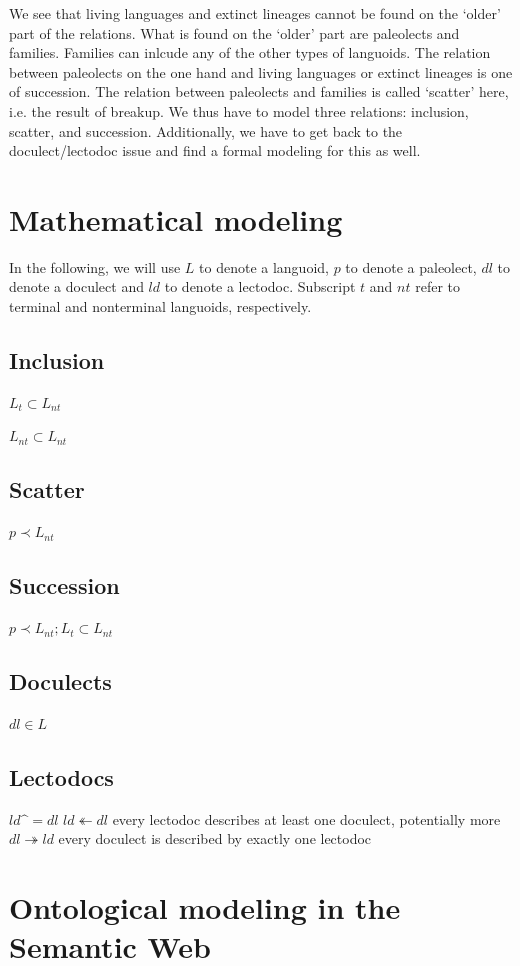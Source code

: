 \documentclass[a4paper,10pt]{article}
\begin{document}
We see that living languages and extinct lineages cannot be found on the `older' part of the relations. What is found on the `older' part are paleolects and families. Families can inlcude any of the other types of languoids. The relation between paleolects on the one hand and living languages or extinct lineages is one of succession. The relation between paleolects and families is called `scatter' here, i.e. the result of breakup. We thus have to model three relations: inclusion, scatter, and succession. Additionally, we have to get back to the doculect/lectodoc issue and find a formal modeling for this as well.

\section{Mathematical modeling}
In the following, we will use $L$ to denote a languoid, $p$ to denote a paleolect, $dl$ to denote a doculect and $ld$ to denote a lectodoc. Subscript $t$ and $nt$ refer to terminal and nonterminal languoids, respectively.

\subsection{Inclusion}
$L_{t} \subset L_{nt}$

$L_{nt} \subset L_{nt}$

\subsection{Scatter}
$p \prec L_{nt}$\prec

\subsection{Succession}
$p \prec L_{nt}; L_{t} \subset L_{nt} $

\subsection{Doculects}
$dl \in L $

\subsection{Lectodocs}
$ld \^= dl $
$ld \twoheadleftarrow  dl$ every lectodoc describes at least one doculect, potentially more
$dl \twoheadrightarrow ld$ every doculect is described by exactly one lectodoc

\section{Ontological modeling in the Semantic Web}
\end{document}
